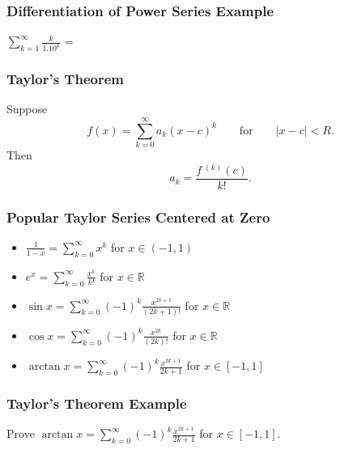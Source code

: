 \documentclass{beamer}
\begin{document}
\begin{frame}[t]
\frametitle{Differentiation of Power Series Example}
\begin{Example}
$\displaystyle\sum_{k = 1}^\infty \frac{k}{1.10^k}$ = 
\end{Example}
\end{frame}

\begin{frame}
\frametitle{Taylor's Theorem}
\begin{Theorem}
Suppose
$$
f(x) = \sum_{k = 0}^\infty a_k (x - c)^k\qquad\text{for}\qquad |x - c| < R.
$$
Then
$$
a_k = \frac{f\ ^{(k)}(c)}{k!}.
$$
\end{Theorem}
\end{frame}

\begin{frame}
\frametitle{Popular Taylor Series Centered at Zero}
{\small
\begin{itemize}
\item $\displaystyle \frac{1}{1 - x} = \sum_{k = 0}^\infty x^k$ for $x\in (-1, 1)$
\item $\displaystyle e^x = \sum_{k = 0}^\infty \frac{x^k}{k!}$ for $x\in\mathbb{R}$
\item $\displaystyle\sin x = \sum_{k = 0}^\infty (-1)^k \frac{x^{2k +1}}{(2k + 1)!}$ for $x\in\mathbb{R}$
\item $\displaystyle\cos x = \sum_{k = 0}^\infty (-1)^k \frac{x^{2k}}{(2k)!}$ for $x\in\mathbb{R}$
\item $\displaystyle\arctan x = \sum_{k = 0}^\infty (-1)^k \frac{x^{2k + 1}}{2k+ 1}$ for $x\in [-1, 1]$
\end{itemize}
}

\end{frame}

\begin{frame}[t]
\frametitle{Taylor's Theorem Example}
\begin{Example}
Prove $\displaystyle\arctan x = \sum_{k = 0}^\infty (-1)^k \frac{x^{2k + 1}}{2k+ 1}$ for $x\in [-1, 1]$.
\end{Example}
\end{frame}

\end{document}
